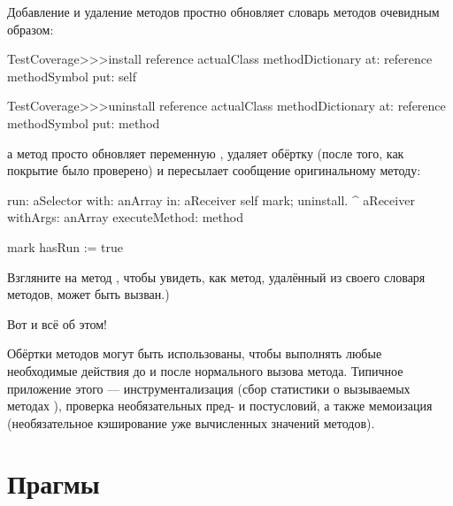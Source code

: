 \documentclass[a4paper,10pt,twoside]{book}
\begin{document}
Добавление и удаление методов простно обновляет словарь методов очевидным образом:
\begin{code}{}
TestCoverage>>>install
	reference actualClass methodDictionary
		at: reference methodSymbol
		put: self

TestCoverage>>>uninstall
	reference actualClass methodDictionary
		at: reference methodSymbol
		put: method
\end{code}
\noindent
а метод  просто обновляет переменную , удаляет обёртку (после того, как покрытие было проверено) и пересылает сообщение оригинальному методу:
\begin{code}{}
run: aSelector with: anArray in: aReceiver
	self mark; uninstall.
	^ aReceiver withArgs: anArray executeMethod: method

mark
	hasRun := true
\end{code}
Взгляните на метод , чтобы увидеть, как метод, удалённый из своего словаря методов, может быть вызван.)

Вот и всё об этом!

Обёртки методов могут быть использованы, чтобы выполнять любые необходимые действия до и после нормального вызова метода. Типичное приложение этого --- инструментализация (сбор статистики о вызываемых методах ), проверка необязательных пред- и постусловий, а также мемоизация (необязательное кэширование уже вычисленных значений методов). 

\section{Прагмы}
\end{document}
